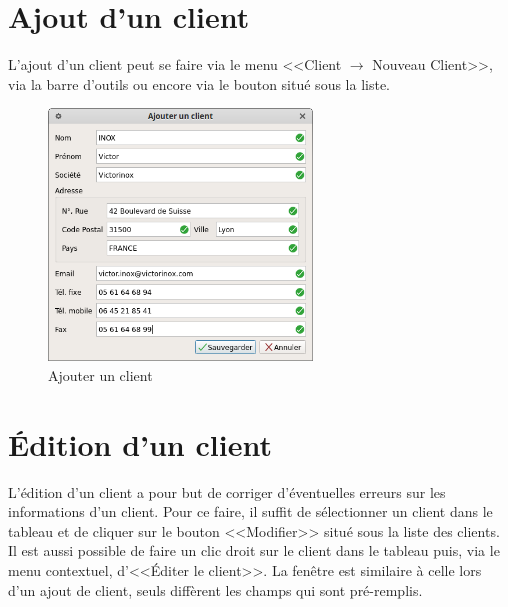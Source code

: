 \section{Ajout d'un client}
L'ajout d’un client peut se faire via le menu <<Client $\rightarrow$ Nouveau Client>>, via la barre d'outils ou encore via le bouton situé sous la
liste. 
\begin{figure}[H]
	\centering
	\includegraphics[width=7cm]{screens/ajouterClient.png}
	\caption{Ajouter un client}
	\label{fig:ajouterClient}
\end{figure}

\section{Édition d'un client}
L’édition d’un client a pour but de corriger d’éventuelles erreurs sur les informations d’un client. Pour ce faire, il suffit de sélectionner
un client dans le tableau et de cliquer sur le bouton <<Modifier>> situé sous la liste des clients. Il est aussi possible de faire un clic droit sur le client dans le tableau puis, via le menu contextuel, d'<<Éditer le client>>.
 La fenêtre est similaire à celle lors d’un ajout de client, seuls diffèrent les champs qui sont pré-remplis. 

